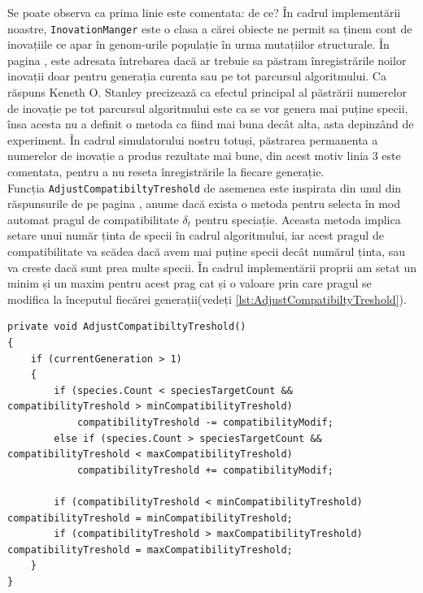 Se poate observa ca prima linie este comentata: de ce? În cadrul implementării noastre, \texttt{Inovation\-Manger} este o clasa  a cărei obiecte ne permit sa ținem cont de inovațiile ce apar în genom-urile populație în urma mutațiilor structurale.
În pagina \cite{NeatFAQ}, este adresata întrebarea dacă ar trebuie sa păstram înregistrările noilor inovații doar pentru generația curenta sau pe tot parcursul algoritmului.
Ca răspuns Keneth O. Stanley precizează ca efectul principal al păstrării numerelor de inovație pe tot parcursul algoritmului este ca se vor genera mai puține specii, însa acesta nu a definit o metoda ca fiind mai buna decât alta, asta depinzând de experiment.
În cadrul simulatorului nostru totuși, păstrarea permanenta a numerelor de inovație a produs rezultate mai bune, din acest motiv linia 3 este comentata, pentru a nu reseta înregistrările la fiecare generație.
\\
Funcția \texttt{Adjust\-Compatibilty\-Treshold} de asemenea este inspirata din unul din răspunsurile de pe pagina \cite{NeatFAQ}, anume dacă exista o metoda pentru selecta în mod automat pragul de compatibilitate $\delta_t$ pentru speciație.
Aceasta metoda implica setare unui număr ținta de specii în cadrul algoritmului, iar acest pragul de compatibilitate va scădea dacă avem mai puține specii decât numărul ținta, sau va creste dacă sunt prea multe specii.
În cadrul implementării proprii am setat un  minim și un maxim pentru acest prag cat și o valoare prin care pragul se modifica la începutul fiecărei generații(vedeți \ref{lst:AdjustCompatibiltyTreshold}).
\begin{lstlisting}[caption={Ajustarea pragului de compatibilitate}, label={lst:AdjustCompatibiltyTreshold}]
private void AdjustCompatibiltyTreshold()
{
    if (currentGeneration > 1)
    {
        if (species.Count < speciesTargetCount && compatibilityTreshold > minCompatibilityTreshold) 
            compatibilityTreshold -= compatibilityModif;
        else if (species.Count > speciesTargetCount && compatibilityTreshold < maxCompatibilityTreshold) 
            compatibilityTreshold += compatibilityModif;

        if (compatibilityTreshold < minCompatibilityTreshold) compatibilityTreshold = minCompatibilityTreshold;
        if (compatibilityTreshold > maxCompatibilityTreshold) compatibilityTreshold = maxCompatibilityTreshold;
    }
}
\end{lstlisting}

